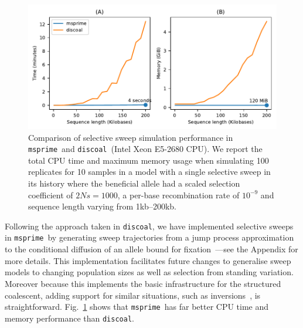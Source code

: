 \documentclass{article}
\newcommand{\msprime}[0]{\texttt{msprime}}
\newcommand{\discoal}[0]{\texttt{discoal}}
\begin{document}
\begin{figure}
\begin{center}
\includegraphics{figures/sweeps-perf}
\end{center}
\caption{\label{fig-selection-perf}Comparison of selective sweep simulation
performance in \msprime\ and \discoal\ (Intel Xeon E5-2680 CPU).
We report the total CPU time and maximum memory usage when simulating 100
replicates for 10 samples in a model
with a single selective sweep in its history where the beneficial
allele had a scaled selection coefficient of $2Ns=1000$,
a per-base recombination rate of $10^{-9}$ and sequence
length varying from 1kb--200kb.}
\end{figure}

Following the approach taken in \discoal, we
have implemented selective sweeps in \msprime\ by generating
sweep trajectories from a jump process approximation to the conditional diffusion
of an allele bound for
fixation~\citep{coop2004ancestral}---see the Appendix for more details.
This implementation facilitates future changes to generalise sweep models to
changing population sizes as well as selection from standing variation.
Moreover because this implements the basic infrastructure for the structured
coalescent, adding support for similar situations,
such as inversions~\citep{peischl2013sequential}, is straightforward.
Fig.~\ref{fig-selection-perf} shows that \msprime\ has far better
CPU time and memory performance than \discoal.
\end{document}
